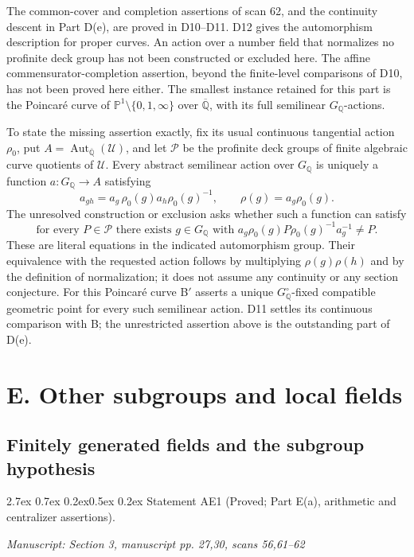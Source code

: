 \documentclass[11pt,a4paper]{article}
\makeatletter
\newcommand{\passage}[1]{\par\smallskip\noindent\textit{Manuscript: #1}\par\smallskip}
\renewcommand\paragraph{\@startsection{paragraph}{4}{\z@}%
  {2.7ex \@plus 0.7ex \@minus 0.2ex}{0.5ex \@plus 0.2ex}%
  {\normalfont\normalsize\bfseries}}
\makeatother
\begin{document}
The common-cover and completion assertions of scan 62, and the
continuity descent in Part D(e), are proved in D10--D11.  D12 gives the
automorphism description for proper curves.  An action over a number
field that normalizes no profinite deck group has not been constructed
or excluded here.  The affine commensurator-completion assertion, beyond
the finite-level comparisons of D10, has not been proved here either.
The smallest instance retained for this part is the Poincar\'e curve of
$\mathbb P^1\setminus\{0,1,\infty\}$ over $\overline{\mathbb Q}$,
with its full semilinear $G_{\mathbb Q}$-actions.

To state the missing assertion exactly, fix its usual continuous
tangential action $\rho_0$, put
$A=\operatorname{Aut}_{\overline{\mathbb Q}}(\mathcal U)$, and let
$\mathscr P$ be the profinite deck groups of finite algebraic curve
quotients of $\mathcal U$.  Every abstract semilinear action over
$G_{\mathbb Q}$ is uniquely a function $a:G_{\mathbb Q}\to A$ satisfying
\[
 a_{gh}=a_g\,\rho_0(g)a_h\rho_0(g)^{-1},
 \qquad \rho(g)=a_g\rho_0(g).
\]
The unresolved construction or exclusion asks whether such a function
can satisfy
\[
 \text{for every }P\in\mathscr P\text{ there exists }g\in G_{\mathbb Q}
 \text{ with }a_g\rho_0(g)P\rho_0(g)^{-1}a_g^{-1}\ne P.
\]
These are literal equations in the indicated automorphism group.
Their equivalence with the requested action follows by multiplying
$\rho(g)\rho(h)$ and by the definition of normalization; it does not
assume any continuity or any section conjecture.
For this Poincar\'e curve B$'$ asserts a unique
$G_{\mathbb Q}^\circ$-fixed compatible geometric point for every such
semilinear action.  D11 settles its continuous comparison with B;
the unrestricted assertion above is the outstanding part of D(e).


\section{E. Other subgroups and local fields}

\subsection{Finitely generated fields and the subgroup hypothesis}
\paragraph{Statement AE1 (Proved; Part E(a), arithmetic and centralizer assertions).}\label{res:AE1}
\passage{Section 3, manuscript pp. 27,30, scans 56,61–62}
\end{document}
